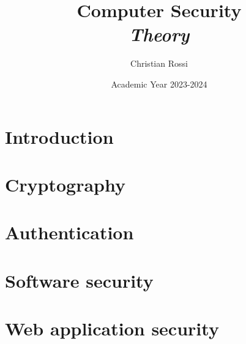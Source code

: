 \documentclass[12pt, a4paper]{report}
\title{Computer Security \\ \textit{Theory}}
\author{Christian Rossi}
\date{Academic Year 2023-2024}
\begin{document}
    \maketitle

    

    \cleardoublepage{}

    \tableofcontents

    \cleardoublepage{}

    \chapter{Introduction}
    
    
    

    \chapter{Cryptography}
    
    
    
    
    
    
    
    
    

    \chapter{Authentication}
    
    
    
    
    

    \chapter{Software security}
    
    
    

    \chapter{Web application security}
    
    
    
    
    
\end{document}
